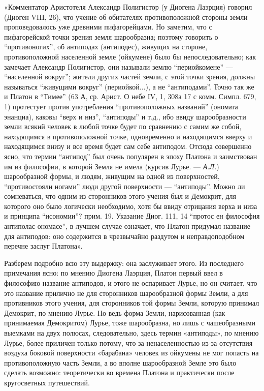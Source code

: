 «Комментатор Аристотеля Александр Полигистор (у Диогена Лаэрция)
говорил (Диоген VIII, 26), что учение об обитателях противоположной
стороны земли проповедовалось уже древними пифагорейцами. Но заметим,
что с пифагорейской точки зрения земля шарообразна; поэтому говорить о
``противоногих'', об антиподах (антиподес), живущих на стороне,
противоположной населенной земле (ойкумене) было бы непоследовательно;
как замечает Александр Полигистор, они называли землю ``периойкомене''
--- ``населенной вокруг''; жители других частей земли, с этой точки
зрения, должны называться ``живущими вокруг'' (периойкой...), а не
``антиподами''. Точно так же и Платон в ``Тимее'' (63 А, ср. Арист. О
небе IV, 1, 308а 17 с комм. Симпл. 679, 1) протестует против
употребления ``противоположных названий'' (ономата энанциа), каковы
``верх и низ'', ``антиподы'' и т.д., ибо ввиду шарообразности земли
всякий человек в любой точке будет по сравнению с самим же собой,
находящимся в противоположной точке, одновременно и находящимся вверху
и находящимся внизу и все время будет сам себе антиподом. Отсюда
совершенно ясно, что термин ``антипод'' был очень популярен в эпоху
Платона и заимствован им из философии, в которой Земля не имела
(курсив Лурье. --- \emph{А.Л.}) шарообразной формы, и людям, живущим
на одной из поверхностей, ``противостояли ногами'' люди другой
поверхности --- ``антиподы''. Можно ли сомневаться, что одним из
сторонников этого учения был и Демокрит, для которого оно было
логически необходимо, хотя бы ввиду отрицания верха и низа и принципа
``исономии''? прим. 19. Указание Диог. 111, 14 ``протос ен философия
антиполас ономасе'', в лучшем случае означает, что Платон придумал
название для антиподов: оно содержится в чрезвычайно раздутом и
неправдоподобном перечне заслуг Платона».

Разберем подробно всю эту выдержку: она заслуживает этого. Из
последнего примечания ясно: по мнению Диогена Лаэрция, Платон первый
ввел в философию название антиподов, и этого не оспаривает Лурье, но
он считает, что это название прилично не для сторонников шарообразной
формы Земли, а для противников этого учения, для сторонников той формы
Земли, которую принимал Демокрит, по мнению Лурье. Но ведь форма
Земли, нарисованная (как принимаемая Демокритом) Лурье, тоже
шарообразна, но лишь с чашеобразными выемками на двух полюсах,
следовательно, здесь термин «антиподы», по мнению Лурье, более
приличен только потому, что за ненаселенностью из-за отсутствия
воздуха боковой поверхности «барабана» человек из ойкумены не мог
попасть на противоположную часть Земли, а во вполне шарообразной Земле
это было сделать возможно: теоретически во времена Платона и
практически после кругосветных путешествий.


